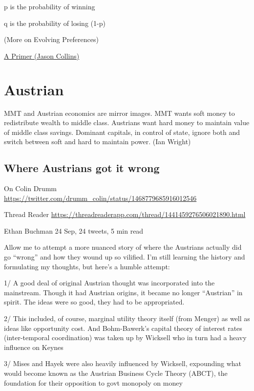 \documentclass[
]{book}
\begin{document}
p is the probability of winning

q is the probability of losing (1-p)

(More on Evolving Preferences)

\href{https://jasoncollins.blog/2020/01/22/ergodicity-economics-a-primer/}{A Primer (Jason Collins)}

\hypertarget{austrian}{%
\chapter{Austrian}\label{austrian}}

MMT and Austrian economics are mirror images. MMT wants soft money to redistribute wealth to middle class. Austrians want hard money to maintain value of middle class savings. Dominant capitals, in control of state, ignore both and switch between soft and hard to maintain power.
(Ian Wright)

\hypertarget{where-austrians-got-it-wrong}{%
\section{Where Austrians got it wrong}\label{where-austrians-got-it-wrong}}

On Colin Drumm
\url{https://twitter.com/drumm_colin/status/1468779685916012546}

Thread Reader
\url{https://threadreaderapp.com/thread/1441459276506021890.html}

Ethan Buchman
24 Sep, 24 tweets, 5 min read

Allow me to attempt a more nuanced story of where the Austrians actually did go ``wrong'' and how they wound up so vilified. I'm still learning the history and formulating my thoughts, but here's a humble attempt:

1/ A good deal of original Austrian thought was incorporated into the mainstream. Though it had Austrian origins, it became no longer ``Austrian'' in spirit. The ideas were so good, they had to be appropriated.

2/ This included, of course, marginal utility theory itself (from Menger) as well as ideas like opportunity cost. And Bohm-Bawerk's capital theory of interest rates (inter-temporal coordination) was taken up by Wicksell who in turn had a heavy influence on Keynes

3/ Mises and Hayek were also heavily influenced by Wicksell, expounding what would become known as the Austrian Business Cycle Theory (ABCT), the foundation for their opposition to govt monopoly on money
\end{document}
